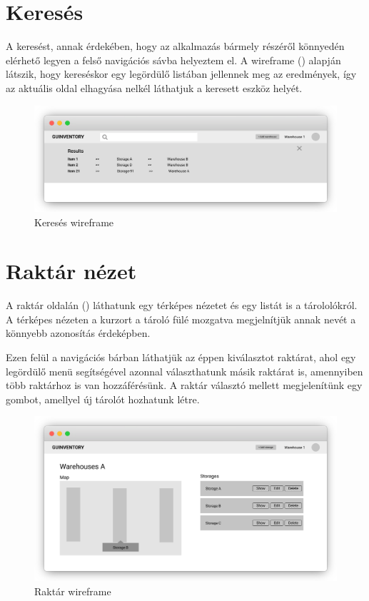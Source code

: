 \section{Keresés}
A keresést, annak érdekében, hogy az alkalmazás bármely részéről könnyedén elérhető legyen a felső navigációs sávba helyeztem el.
A wireframe () alapján látszik, hogy kereséskor egy legördülő listában jellennek meg az eredmények, így az aktuális oldal elhagyása nelkél láthatjuk a keresett eszköz helyét.
\begin{figure}[!ht]
  \centering
  \includegraphics[width=150mm, keepaspectratio]{figures/wireframes/search.png}
  \caption{Keresés wireframe}
  \label{fig:SearchWireframe}
\end{figure}


\section{Raktár nézet}
A raktár oldalán () láthatunk egy térképes nézetet és egy listát is a tárololókról. 
A térképes nézeten a kurzort a tároló fülé mozgatva megjelnítjük annak nevét a könnyebb azonosítás érdeképben.

Ezen felül a navigációs bárban láthatjük az éppen kiválasztot raktárat, ahol egy legördülő menü segítségével azonnal választhatunk másik raktárat is, amennyiben több raktárhoz is van hozzáférésünk.
A raktár választó mellett megjelenítünk egy gombot, amellyel új tárolót hozhatunk létre.
\begin{figure}[!ht]
  \centering
  \includegraphics[width=150mm, keepaspectratio]{figures/wireframes/frame_warehouse.png}
  \caption{Raktár wireframe}
  \label{fig:WarehouseWireframe}
\end{figure}

